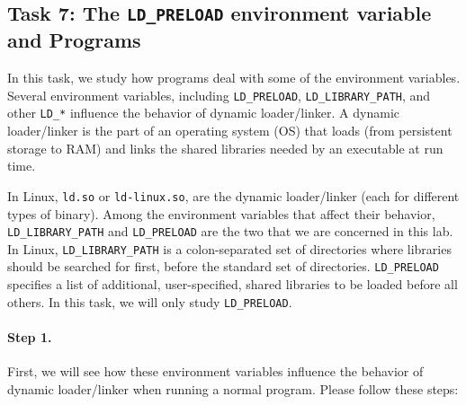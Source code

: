\subsection{Task 7: The {\tt LD\_PRELOAD} environment variable and \setuid
Programs}

In this task, we study how \setuid programs deal
with some of the environment variables.
Several environment variables, including {\tt LD\_PRELOAD}, 
{\tt LD\_LIBRARY\_PATH}, and other {\tt LD\_*} influence the 
behavior of dynamic loader/linker.
A dynamic loader/linker is the part of an operating system (OS) that 
loads (from persistent storage to RAM) and links the shared libraries 
needed by an executable at run time. 

In Linux, {\tt ld.so} or {\tt ld-linux.so}, are the dynamic 
loader/linker (each for different types of binary).
Among the environment variables that affect their behavior,
{\tt LD\_LIBRARY\_PATH} and {\tt LD\_PRELOAD} are the two
that we are concerned in this lab. 
In Linux, {\tt LD\_LIBRARY\_PATH} is a colon-separated set
of directories where libraries should be searched for first, before the
standard set of directories. 
{\tt LD\_PRELOAD} specifies a list of additional, user-specified, shared libraries to
be loaded before all others. In this task, we will only 
study {\tt LD\_PRELOAD}.


\paragraph{Step 1.} 
First, we will see how these environment variables influence the 
behavior of dynamic loader/linker when running a normal program. 
Please follow these steps:


